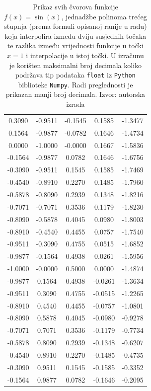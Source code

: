 \documentclass[12pt,a4paper]{report}
\begin{document}
\begin{table}
\begin{center}
\begin{tabular}{c c c c | c}
0.3090 & -0.9511 & -0.1545 & 0.1585 & -1.3477 \\
0.1564 & -0.9877 & -0.0782 & 0.1646 & -1.4734 \\
0.0000 & -1.0000 & -0.0000 & 0.1667 & -1.5836 \\
-0.1564 & -0.9877 & 0.0782 & 0.1646 & -1.6756 \\
-0.3090 & -0.9511 & 0.1545 & 0.1585 & -1.7469 \\
-0.4540 & -0.8910 & 0.2270 & 0.1485 & -1.7960 \\
-0.5878 & -0.8090 & 0.2939 & 0.1348 & -1.8216 \\
-0.7071 & -0.7071 & 0.3536 & 0.1179 & -1.8230 \\
-0.8090 & -0.5878 & 0.4045 & 0.0980 & -1.8003 \\
-0.8910 & -0.4540 & 0.4455 & 0.0757 & -1.7540 \\
-0.9511 & -0.3090 & 0.4755 & 0.0515 & -1.6852 \\
-0.9877 & -0.1564 & 0.4938 & 0.0261 & -1.5956 \\
-1.0000 & -0.0000 & 0.5000 & 0.0000 & -1.4874 \\
-0.9877 & 0.1564 & 0.4938 & -0.0261 & -1.3634 \\
-0.9511 & 0.3090 & 0.4755 & -0.0515 & -1.2265 \\
-0.8910 & 0.4540 & 0.4455 & -0.0757 & -1.0801 \\
-0.8090 & 0.5878 & 0.4045 & -0.0980 & -0.9278 \\
-0.7071 & 0.7071 & 0.3536 & -0.1179 & -0.7734 \\
-0.5878 & 0.8090 & 0.2939 & -0.1348 & -0.6207 \\
-0.4540 & 0.8910 & 0.2270 & -0.1485 & -0.4735 \\
-0.3090 & 0.9511 & 0.1545 & -0.1585 & -0.3352 \\
-0.1564 & 0.9877 & 0.0782 & -0.1646 & -0.2095 \\
			
			
		\end{tabular}
	\end{center}
	\caption{
		Prikaz svih čvorova funkcije $f(x)=\sin(x)$, jednadžbe polinoma trećeg stupnja (prema formuli opisanoj ranije u radu) koja interpolira između dviju susjednih točaka te razlika između vrijednosti funkcije u točki $x=1$ i interpolacije u istoj točki. U izračunu je korišten maksimalni broj decimala koliko podržava tip podataka \texttt{float} iz \texttt{Python} biblioteke \texttt{Numpy}. Radi preglednosti je prikazan manji broj decimala. Izvor: autorska izrada}
	\label{kubInterpolTablicaSin}
\end{table}
\end{document}
